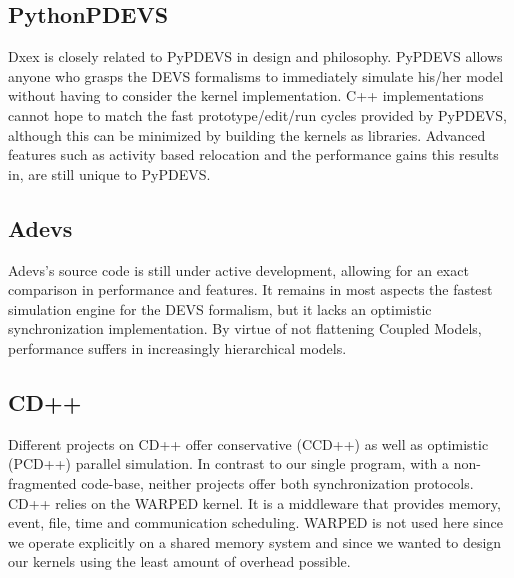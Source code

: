 \subsection{PythonPDEVS}
Dxex is closely related to PyPDEVS in design and philosophy. PyPDEVS allows anyone who grasps the DEVS formalisms to immediately simulate his/her model without having to consider the kernel implementation. C++ implementations cannot hope to match the fast prototype/edit/run cycles provided by PyPDEVS, although this can be minimized by building the kernels as libraries. %
Advanced features such as activity based relocation and the performance gains this results in, are still unique to PyPDEVS.
\subsection{Adevs}
Adevs's source code is still under active development, allowing for an exact comparison in performance and features. It remains in most aspects the fastest simulation engine for the DEVS formalism, but it lacks an optimistic synchronization implementation. %
By virtue of not flattening Coupled Models, performance suffers in increasingly hierarchical models.
\subsection{CD++}
Different projects on CD++ offer conservative (CCD++) as well as optimistic (PCD++) parallel simulation. In contrast to our single program, with a non-fragmented code-base, neither projects offer both synchronization protocols. CD++ relies on the WARPED kernel. It is a middleware that provides memory, event, file, time and communication scheduling. WARPED is not used here since we operate explicitly on a shared memory system and since we wanted to design our kernels using the least amount of overhead possible.
